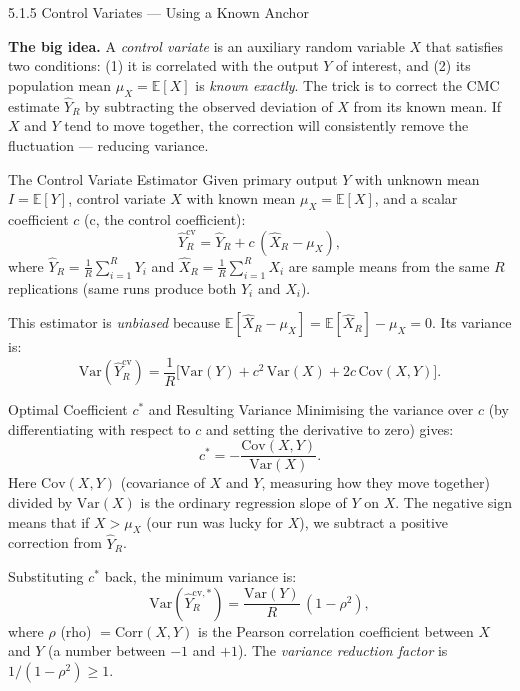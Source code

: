 \documentclass[aspectratio=169,10pt]{beamer}
\begin{document}
\begin{frame}[allowframebreaks]{5.1.5 Control Variates --- Using a Known Anchor}

\textbf{The big idea.}
A \emph{control variate} is an auxiliary random variable $X$ that satisfies
two conditions: (1) it is correlated with the output $Y$ of interest, and
(2) its population mean $\mu_X = \mathbb{E}[X]$ is \emph{known exactly}.
The trick is to correct the CMC estimate $\hat{Y}_R$ by subtracting the
observed deviation of $X$ from its known mean.
If $X$ and $Y$ tend to move together, the correction will consistently
remove the fluctuation --- reducing variance.

\begin{block}{The Control Variate Estimator}
  Given primary output $Y$ with unknown mean $I = \mathbb{E}[Y]$,
  control variate $X$ with known mean $\mu_X = \mathbb{E}[X]$,
  and a scalar coefficient $c$ (c, the control coefficient):
  \[
    \hat{Y}_R^{\mathrm{cv}} = \hat{Y}_R + c\,(\hat{X}_R - \mu_X),
  \]
  where $\hat{Y}_R = \frac{1}{R}\sum_{i=1}^R Y_i$ and
  $\hat{X}_R = \frac{1}{R}\sum_{i=1}^R X_i$ are sample means from the same
  $R$ replications (same runs produce both $Y_i$ and $X_i$).

  This estimator is \emph{unbiased} because
  $\mathbb{E}[\hat{X}_R - \mu_X] = \mathbb{E}[\hat{X}_R] - \mu_X = 0$.
  Its variance is:
  \[
    \mathrm{Var}(\hat{Y}_R^{\mathrm{cv}})
    = \frac{1}{R}\bigl[\mathrm{Var}(Y) + c^2\,\mathrm{Var}(X)
      + 2c\,\mathrm{Cov}(X,Y)\bigr].
  \]
\end{block}

\framebreak

\begin{block}{Optimal Coefficient $c^*$ and Resulting Variance}
  Minimising the variance over $c$ (by differentiating with respect to $c$
  and setting the derivative to zero) gives:
  \[
    c^* = -\frac{\mathrm{Cov}(X,Y)}{\mathrm{Var}(X)}.
  \]
  Here $\mathrm{Cov}(X,Y)$ (covariance of $X$ and $Y$, measuring how they
  move together) divided by $\mathrm{Var}(X)$ is the ordinary regression slope
  of $Y$ on $X$.  The negative sign means that if $X > \mu_X$ (our run was
  lucky for $X$), we subtract a positive correction from $\hat{Y}_R$.

  Substituting $c^*$ back, the minimum variance is:
  \[
    \mathrm{Var}(\hat{Y}_R^{\mathrm{cv},*})
    = \frac{\mathrm{Var}(Y)}{R}\,(1 - \rho^2),
  \]
  where $\rho$ (rho) $= \mathrm{Corr}(X,Y)$ is the Pearson correlation
  coefficient between $X$ and $Y$ (a number between $-1$ and $+1$).
  The \emph{variance reduction factor} is $1/(1-\rho^2) \ge 1$.
\end{block}


\end{frame}
\end{document}
